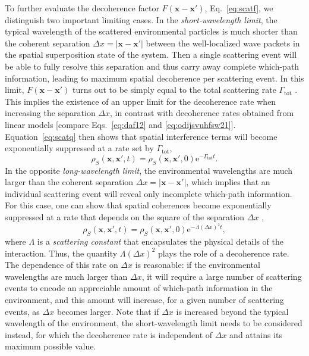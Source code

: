 \documentclass[aps,pra,reprint,amsmath,amssymb,showpacs,nofootinbib,floatfix,onecolumn,12pt]{revtex4-1}
\providecommand{\abs}[1]{\left\lvert#1\right\rvert}
\newcommand{\E}{\text{e}}
\newcommand{\bvec}[1]{\ensuremath{\mathbf{#1}}}
\begin{document}
To further evaluate the decoherence factor $F(\bvec{x} - \bvec{x}')$, Eq.~\eqref{eq:scatf}, we distinguish two important limiting cases. In the \emph{short-wavelength limit}, the typical wavelength of the scattered environmental particles is much shorter than the
coherent separation $\Delta x = \abs{\bvec{x}-\bvec{x}'}$ between the well-localized wave packets in the spatial superposition state of the system. Then a single scattering event will be able to fully resolve this separation and thus carry away complete which-path information, leading to maximum spatial decoherence per scattering event. In this limit, $F(\bvec{x} - \bvec{x}')$ turns out to be simply equal to the total scattering rate $\Gamma_\text{tot}$ \cite{Schlosshauer:2007:un}. This implies the existence of an upper limit for the decoherence rate when increasing the separation $\Delta x$, in contrast with decoherence rates obtained from linear models [compare Eqs.~\eqref{eq:daf12} and \eqref{eq:odijsvuhfsw21}]. Equation~\eqref{eq:scatq} then shows that spatial interference terms will become exponentially suppressed at a rate set by $\Gamma_\text{tot}$,
%
\begin{equation}\label{eq:sees}
\rho_S(\bvec{x},\bvec{x}',t) =
\rho_S(\bvec{x},\bvec{x}',0) \E^{-\Gamma_\text{tot} t}.
\end{equation}
%
In the opposite \emph{long-wavelength limit}, the environmental wavelengths are much larger than the coherent separation $\Delta x = \abs{\bvec{x}-\bvec{x}'}$, which implies that an individual scattering event will reveal only incomplete which-path information. For this case, one can show that spatial coherences become exponentially suppressed at a rate that depends on the square of the separation $\Delta x$ \cite{Schlosshauer:2007:un},
%
\begin{equation}\label{eq:scwer2}
\rho_S(\bvec{x},\bvec{x}',t) =
\rho_S(\bvec{x},\bvec{x}',0) \E^{-\Lambda (\Delta x)^2 t},
\end{equation}
%
where $\Lambda$ is a \emph{scattering constant} that encapsulates the physical details of the interaction. Thus, the quantity $\Lambda (\Delta x)^2$ plays the role of a decoherence rate. The dependence of this rate on $\Delta x$ is reasonable: if the environmental wavelengths are much larger than $\Delta x$, it will require a large number of scattering events to encode an appreciable amount of which-path information in the environment, and this amount will increase, for a given number of scattering events, as $\Delta x$ becomes larger. Note that if $\Delta x$ is increased beyond the typical wavelength of the environment, the short-wavelength limit needs to be considered instead, for which the decoherence rate is independent of $\Delta x$ and attains its maximum possible value.
\end{document}
